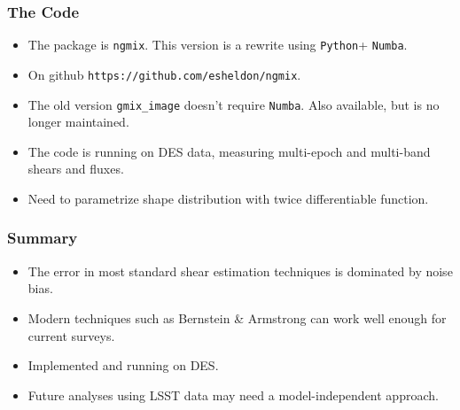 \documentclass{beamer}
\newcommand{\numba}{\texttt{Numba}}
\newcommand{\python}{\texttt{Python}}
\newcommand{\ngmix}{\texttt{ngmix}}
\begin{document}
\frame
{
    \frametitle{The Code}

    \begin{itemize}

        \item The package is \ngmix.  This version is a rewrite using {\texttt
            \python + \numba}.

        \item On github  \texttt{https://github.com/esheldon/ngmix}. 
            
        \item The old version \texttt{gmix\_image} doesn't require \numba.
            Also available, but is no longer maintained.

        \item The code is running on DES data, measuring multi-epoch and
            multi-band shears and fluxes.  
            
        \item Need to parametrize shape distribution with twice differentiable
            function.

    \end{itemize}
}
\frame
{
    \frametitle{Summary}

    \begin{itemize}

        \item The error in most standard shear estimation techniques is
            dominated by noise bias.

        \item Modern techniques such as Bernstein \& Armstrong can work well
            enough for current surveys.

        \item Implemented and running on DES.

        \item Future analyses using LSST data may need a model-independent
            approach.

    \end{itemize}
}
\end{document}
